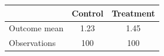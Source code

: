 \begin{tabular}{lcc}
\toprule
 & Control & Treatment \\
\midrule
Outcome mean & 1.23 & 1.45\sym{*} \\
Observations & 100 & 100 \\
\bottomrule
\end{tabular}
